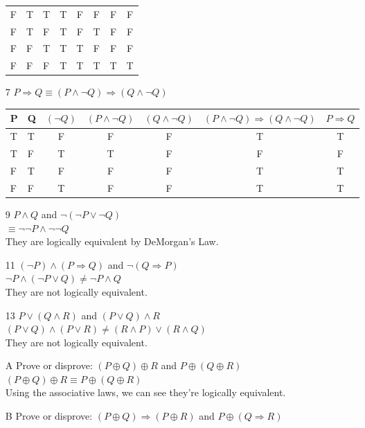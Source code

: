 \documentclass[12pt]{article}
\begin{document}
\begin{enumerate}
\begin{tabular}{l|l|l|c|c|c|c|c}
		F & T & T & T   & F    & F    & F & F \\
		F & T & F & T   & F    & T    & F & F \\
		F & F & T & T   & T    & F    & F & F \\
		F & F & F & T   & T    & T    & T & T \\
		\hline
	    \end{tabular}
    \item [7] $P\Rightarrow Q \equiv (P \land \neg Q) \Rightarrow (Q \land \neg Q)$\\
	    \begin{tabular}{l|l|c|c|c|c|c}
		\hline
		P & Q & $(\neg Q)$ & $(P \land \neg Q)$ & $(Q \land \neg Q)$ & $ (P \land \neg Q) \Rightarrow (Q \land \neg Q)$ & $P\Rightarrow Q$\\
		\hline
		T & T & F     & F         & F & T & T \\
		T & F & T     & T         & F & F & F \\
		F & T & F     & F         & F & T & T \\
		F & F & T     & F         & F & T & T \\
		\hline
	    \end{tabular}
	\item [9] $P \land Q$ and $\neg(\neg P \lor \neg Q)$\\
	    $\equiv \neg\neg P \land \neg \neg Q$\\
	    They are logically equivalent by DeMorgan's Law.
	\item [11] $(\neg P) \land (P \Rightarrow Q)$ and $\neg (Q \Rightarrow P)$\\
	    $\neg P \land (\neg P \lor Q) \neq \neg P \land Q$\\
	    They are not logically equivalent.
	\item [13] $P \lor (Q \land R)$ and $(P \lor Q) \land R$\\
	    $(P\lor Q) \land (P\lor R) \neq (R\land P) \lor (R \land Q)$\\
	    They are not logically equivalent.
	\item [A] Prove or disprove: $(P \oplus Q) \oplus R$ and $P \oplus (Q \oplus R)$\\
	    $(P \oplus Q) \oplus R \equiv P \oplus (Q \oplus R)$\\
	    Using the associative laws, we can see they're logically equivalent.
	\item [B] Prove or disprove: $(P \oplus Q) \Rightarrow (P \oplus R)$ and $P \oplus (Q \Rightarrow R)$\\

\end{enumerate}
\end{document}
